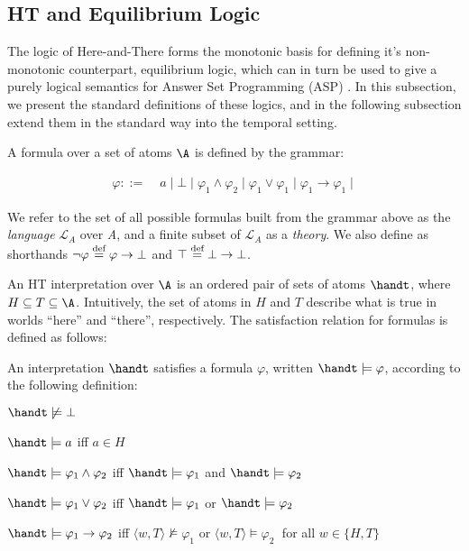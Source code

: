 \subsection{HT and Equilibrium Logic}

The logic of Here-and-There forms the monotonic basis for defining
it's non-monotonic counterpart, equilibrium logic, which can in turn
be used to give a purely logical semantics for Answer Set Programming
(ASP) \cite{pearce06a}. In this subsection, we present the standard
definitions of these logics, and in the following subsection extend
them in the standard way into the temporal setting.

A formula over a set of atoms $\A$ is defined by the grammar:

\begin{align*}
    \varphi ::= &\; a \mid \bot \mid
                  \varphi_1 \wedge \varphi_2 \mid
                  \varphi_1 \vee \varphi_1 \mid
                  \varphi_1 \to \varphi_1 \mid
\end{align*}

We refer to the set of all possible formulas built from the grammar above as the \textit{language} $\mathcal{L}_A$ over \textit{A}, and a finite subset of $\mathcal{L}_A$ as a \textit{theory}.
We also define as shorthands $\neg \varphi \stackrel{\text{def}}{=} \varphi \to \bot$ and
$\top \stackrel{\text{def}}{=} \bot \to \bot$.

An HT interpretation over $\A$ is an ordered pair of sets of atoms
$\handt$, where $H \subseteq T \subseteq \A$. Intuitively, the set of
atoms in $H$ and $T$ describe what is true in worlds ``here'' and
``there'', respectively. The satisfaction relation for formulas is
defined as follows:

\begin{definition}[HT satisfaction]
    An interpretation $\handt$ satisfies a formula $\varphi$, written $\handt \models \varphi$, according to the following definition:
    \begin{description}
        \item $\handt \not \models \bot$
        \item $\handt \models a$ iff $a\in H$
        \item $\handt \models \varphi_1 \wedge \varphi_2$ iff $\handt \models \varphi_1$ and  $\handt \models \varphi_2$
        \item $\handt \models \varphi_1 \vee \varphi_2$ iff $\handt \models \varphi_1$ or  $\handt \models \varphi_2$
        \item $\handt \models \varphi_1 \to \varphi_2$ iff $\langle w,T \rangle \not \models \varphi_1$ or  $\langle w,T \rangle \models \varphi_2\;$ for all 
        $w \in \{H,T\}$
    \end{description}
\end{definition}

